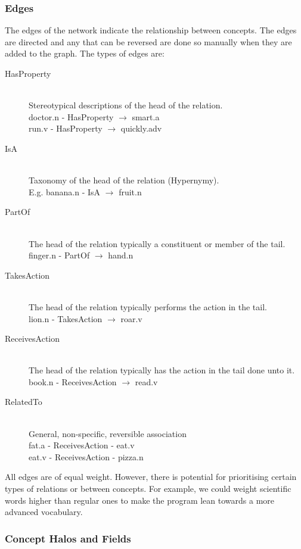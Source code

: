 \subsubsection{Edges}
The edges of the network indicate the relationship between concepts. The edges are directed and any that can be reversed are done so manually when they are added to the graph. The types of edges are:
\begin{description}
\item[HasProperty] \hfill \\ Stereotypical descriptions of the head of the relation. \hfill \\ doctor.n - HasProperty $\rightarrow$ smart.a \hfill \\ run.v - HasProperty $\rightarrow$ quickly.adv
\item[IsA] \hfill \\ Taxonomy of the head of the relation (Hypernymy). \hfill \\ E.g. banana.n - IsA $\rightarrow$ fruit.n
\item[PartOf] \hfill \\ The head of the relation typically a constituent or member of the tail.  \hfill \\ finger.n - PartOf $\rightarrow$ hand.n
\item[TakesAction] \hfill \\The head of the relation typically performs the action in the tail. \hfill \\ lion.n - TakesAction $\rightarrow$ roar.v
\item[ReceivesAction] \hfill \\The head of the relation typically has the action in the tail done unto it. \hfill \\ book.n - ReceivesAction $\rightarrow$ read.v
\item[RelatedTo] \hfill \\ General, non-specific, reversible association \hfill \\ fat.a - ReceivesAction - eat.v \hfill \\ eat.v - ReceivesAction - pizza.n
\end{description}

All edges are of equal weight. However, there is potential for prioritising certain types of relations or between concepts. For example, we could weight scientific words higher than regular ones to make the program lean towards a more advanced vocabulary.


\subsubsection{Concept Halos and Fields}

